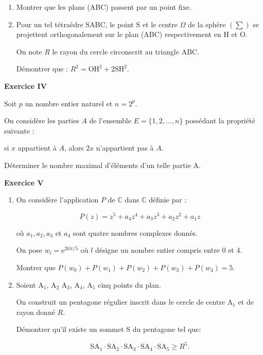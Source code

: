 \documentclass[a4paper,11pt]{article}
\newcommand{\C}{\mathbb{C}}
\begin{document}
\medskip

\begin{enumerate}
\item Montrer que les plans (ABC) passent par un point fixe.
\item Pour un tel tétraèdre SABC, le point S et le centre $\Omega$ de la sphère $(\sum)$ se projettent orthogonalement sur le plan (ABC) respectivement en H et O. 

On note $R$ le rayon du cercle circonscrit au triangle ABC.

Démontrer que : $R^2 = \text{OH}^2 +2\text{SH}^2$.
\end{enumerate}

\begin{center}\textbf{{\color{blue} Exercice IV}}
\end{center}

Soit $p$ un nombre entier naturel et $n = 2^p$.

On considère les parties $A$ de l'ensemble $E = \{1, 2, \ldots , n\}$ possédant la propriété suivante :

\begin{center}
si $x$ appartient à $A$, alors $2x$ n'appartient pas à $A$.\end{center}

Déterminer le nombre maximal d'éléments d'un telle partie A.

\begin{center}\textbf{{\color{blue} Exercice V}}
\end{center}

\begin{enumerate}
\item On considère l'application $P$ de $\C$ dans $\C$ définie par :

\[P(z) = z^5 + a_4z^4 + a_3z^3 + a_2z^2 + a_1z\]

où $a_1, a_2, a_3$ et $a_4$ sont quatre nombres complexes donnés.

On pose $w_l = \text{e}^{2\text{i}l\pi/5}$ où $l$ désigne un nombre entier compris entre 0 et 4.

Montrer que $P\left(w_0\right) + P\left(w_1\right) + P\left(w_2\right) + P\left(w_3\right) + P\left(w_4\right) = 5$.
\item Soient A$_1$, A$_2$ A$_3$, A$_4$, A$_5$ cinq points du plan. 

On construit un pentagone régulier inscrit dans le cercle de centre A$_1$ et de rayon donné $R$.

Démontrer qu'il existe un sommet S du pentagone tel que:

\[\text{SA}_1 \cdot \text{SA}_2 \cdot\text{SA}_3 \cdot\text{SA}_4 \cdot\text{SA}_5 \geqslant R^5.\]
\end{enumerate}
\end{document}
